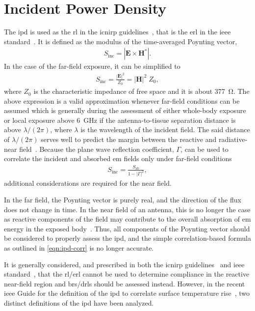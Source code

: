 \section{Incident Power Density}
The \gls{ipd} is used as the \gls{rl} in the \gls{icnirp} guidelines~\cite{ICNIRP2020Guidelines}, that is the \gls{erl} in the \gls{ieee} standard~\cite{IEEE2019Standard}.
It is defined as the modulus of the time-averaged Poynting vector,
\begin{align}
    \label{eqn:ipd}
    S_\text{inc} = |\mathbf{E} \times \mathbf{H}^* |.
\end{align}
In the case of the far-field exposure, it can be simplified to
\begin{align}
    \label{eqn:ipd-far-field}
    S_\text{inc} = \frac{|\mathbf{E}|^2}{Z_0} = |\mathbf{H}|^2 \; Z_0,
\end{align}
where $Z_0$ is the characteristic impedance of free space and it is about \SI{377}{\ohm}.
The above expression is a valid approximation whenever far-field conditions can be assumed which is generally during the assessment of either whole-body exposure or local exposure above \SI{6}{\GHz} if the antenna-to-tissue separation distance is above $\lambda / (2 \pi)$, where $\lambda$ is the wavelength of the incident field.
The said distance of $\lambda / (2 \pi)$ serves well to predict the margin between the reactive and radiative-near field~\cite{Carrasco2019Exposure}.
Because the plane wave reflection coefficient, $\Gamma$, can be used to correlate the incident and absorbed \gls{em} fields only under far-field conditions
\begin{align}
    \label{eqn:ipd-corr}
    S_\text{inc} = \frac{S_\text{ab}}{1 - |\Gamma|^2},
\end{align}
additional considerations are required for the near field.

In the far field, the Poynting vector is purely real, and the direction of the flux does not change in time.
In the near field of an antenna, this is no longer the case as reactive components of the field may contribute to the overall absorption of \gls{em} energy in the exposed body~\cite{Kuster1992Energy}.
Thus, all components of the Poynting vector should be considered to properly assess the \gls{ipd}, and the simple correlation-based formula as outlined in \cref{eqn:ipd-corr} is no longer accurate.

It is generally considered, and prescribed in both the \gls{icnirp} guidelines~\cite{ICNIRP2020Guidelines} and \gls{ieee} standard~\cite{IEEE2019Standard}, that the \gls{rl}/\gls{erl} cannot be used to determine compliance in the reactive near-field region and \gls{br}s/\gls{drl}s should be assessed instead.
However, in the recent \gls{ieee} Guide for the definition of the \gls{ipd} to correlate surface temperature rise~\cite{IEEE2021Guide}, two distinct definitions of the \gls{ipd} have been analyzed.

